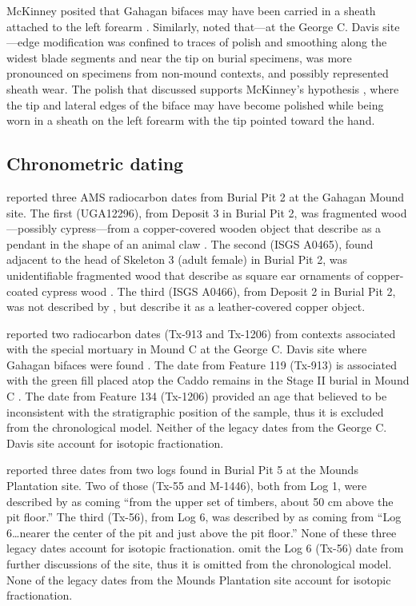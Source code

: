 \documentclass[review]{elsarticle}
\begin{document}
McKinney posited that Gahagan bifaces may have been carried in a sheath attached to the left forearm \citep{RN11561}. Similarly, \citet{RN3684} noted that---at the George C. Davis site---edge modification was confined to traces of polish and smoothing along the widest blade segments and near the tip on burial specimens, was more pronounced on specimens from non-mound contexts, and possibly represented sheath wear. The polish that \citet{RN3684} discussed supports McKinney’s hypothesis \citep{RN11561}, where the tip and lateral edges of the biface may have become polished while being worn in a sheath on the left forearm with the tip pointed toward the hand.

\subsection*{Chronometric dating}

\citet[Table 1]{RN4783} reported three AMS radiocarbon dates from Burial Pit 2 at the Gahagan Mound site. The first (UGA12296), from Deposit 3 in Burial Pit 2, was fragmented wood—possibly cypress—from a copper-covered wooden object that \citet[99, Plate 29, No. 2, Object 5]{RN5274} describe as a pendant in the shape of an animal claw \citep{RN4783}. The second (ISGS A0465), found adjacent to the head of Skeleton 3 (adult female) in Burial Pit 2, was unidentifiable fragmented wood that \citet[96, Plate 21 and 28, Nos. 2-3]{RN5274} describe as square ear ornaments of copper-coated cypress wood \citep{RN4783}. The third (ISGS A0466), from Deposit 2 in Burial Pit 2, was not described by \citet[96]{RN5274}, but \citet[62]{RN4783} describe it as a leather-covered copper object.

\citet[Table 1]{RN3714} reported two radiocarbon dates (Tx-913 and Tx-1206) from contexts associated with the special mortuary in Mound C at the George C. Davis site where Gahagan bifaces were found \citep[Table 5]{RN3714}. The date from Feature 119 (Tx-913) is associated with the green fill placed atop the Caddo remains in the Stage II burial in Mound C \citep{RN3714}. The date from Feature 134 (Tx-1206) provided an age that \citet{RN3714} believed to be inconsistent with the stratigraphic position of the sample, thus it is excluded from the chronological model. Neither of the legacy dates from the George C. Davis site account for isotopic fractionation.

\citet[72]{RN11561} reported three dates from two logs found in Burial Pit 5 at the Mounds Plantation site. Two of those (Tx-55 and M-1446), both from Log 1, were described by \citet[72]{RN11561} as coming “from the upper set of timbers, about 50 cm above the pit floor.” The third (Tx-56), from Log 6, was described by \citet[72]{RN11561} as coming from “Log 6…nearer the center of the pit and just above the pit floor.” None of these three legacy dates account for isotopic fractionation. \citet{RN11561} omit the Log 6 (Tx-56) date from further discussions of the site, thus it is omitted from the chronological model. None of the legacy dates from the Mounds Plantation site account for isotopic fractionation.
\end{document}
